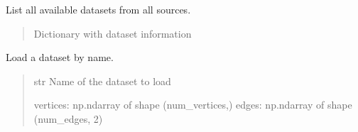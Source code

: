 \documentclass[letterpaper,10pt,english]{sphinxmanual}
\begin{document}

\begin{fulllineitems}
\label{\detokenize{api_reference:graphem.datasets.list_available_datasets}}
\pysigstartsignatures
{}
\pysigstopsignatures
\sphinxAtStartPar
List all available datasets from all sources.
\begin{quote}\begin{description}
\sphinxAtStartPar
Dictionary with dataset information

\sphinxAtStartPar
{}

\end{description}\end{quote}

\end{fulllineitems}


\begin{fulllineitems}
\label{\detokenize{api_reference:graphem.datasets.load_dataset}}
\pysigstartsignatures
{}
\pysigstopsignatures
\sphinxAtStartPar
Load a dataset by name.
\begin{quote}\begin{description}
\sphinxAtStartPar
{} \textendash{} str
Name of the dataset to load

\sphinxAtStartPar
\begin{description}
\sphinxAtStartPar
vertices: np.ndarray of shape (num\_vertices,)
edges: np.ndarray of shape (num\_edges, 2)

\end{description}


\sphinxAtStartPar
{}

\end{description}\end{quote}

\end{fulllineitems}
\end{document}
